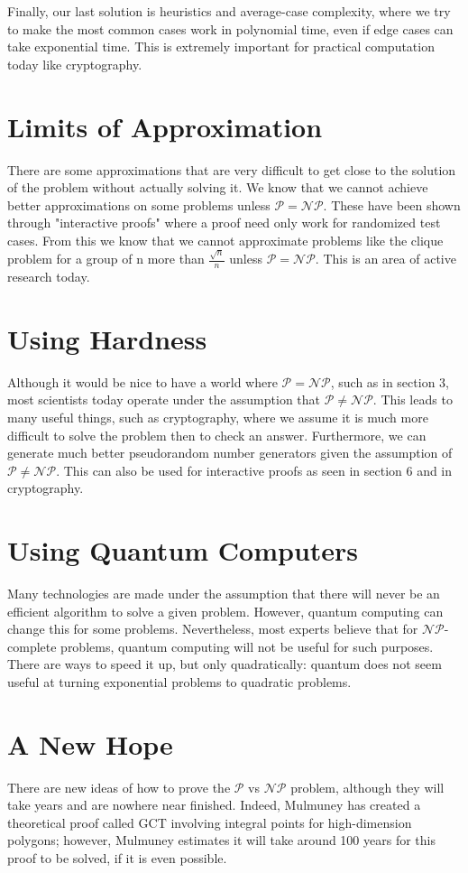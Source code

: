 \documentclass[11pt]{article}
\begin{document}
Finally, our last solution is heuristics and average-case complexity, where we try to make the most common cases work in polynomial time, even if edge cases can take exponential time. This is extremely important for practical computation today like cryptography.
\section{Limits of Approximation}
There are some approximations that are very difficult to get close to the solution of the problem without actually solving it. We know that we cannot achieve better approximations on some problems unless $\mathcal{P} = \mathcal{NP}$. These have been shown through "interactive proofs" where a proof need only work for randomized test cases. From this we know that we cannot approximate problems like the clique problem for a group of n more than $\frac{\sqrt{n}}{n}$ unless $\mathcal{P} = \mathcal{NP}$. This is an area of active research today. 
\section {Using Hardness}
Although it would be nice to have a world where $\mathcal{P} = \mathcal{NP}$, such as in section 3, most scientists today operate under the assumption that $\mathcal{P} \neq \mathcal{NP}$. This leads to many useful things, such as cryptography, where we assume it is much more difficult to solve the problem then to check an answer. Furthermore, we can generate much better pseudorandom number generators given the assumption of $\mathcal{P} \neq \mathcal{NP}$. This can also be used for interactive proofs as seen in section 6 and in cryptography. 
\section {Using Quantum Computers}
Many technologies are made under the assumption that there will never be an efficient algorithm to solve a given problem. However, quantum computing can change this for some problems. Nevertheless, most experts believe that for $\mathcal{NP}$-complete problems, quantum computing will not be useful for such purposes.  There are ways to speed it up, but only quadratically: quantum does not seem useful at turning exponential problems to quadratic problems. 
\section {A New Hope}
There are new ideas of how to prove the $\mathcal{P}$ vs $\mathcal{NP}$ problem, although they will take years and are nowhere near finished. Indeed, Mulmuney has created a theoretical proof called GCT involving integral points for high-dimension polygons; however, Mulmuney estimates it will take around 100 years for this proof to be solved, if it is even possible. 
\end{document}
